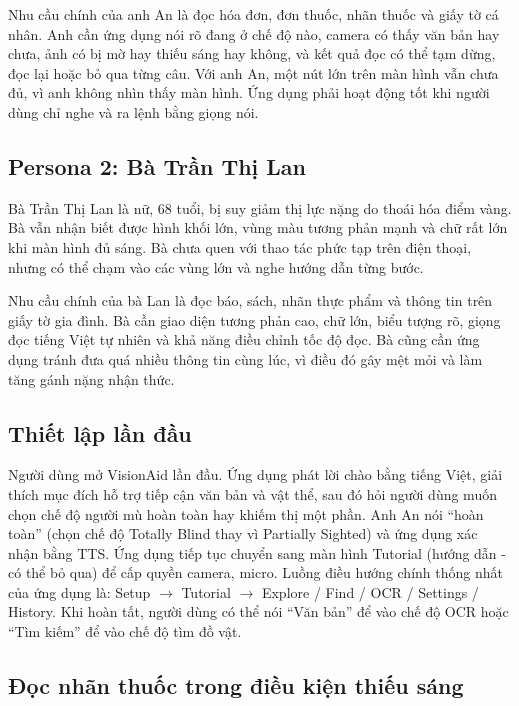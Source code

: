 \documentclass[a4paper,13pt]{report}
\begin{document}
Nhu cầu chính của anh An là đọc hóa đơn, đơn thuốc, nhãn thuốc và giấy tờ cá nhân. Anh cần ứng dụng nói rõ đang ở chế độ nào, camera có thấy văn bản hay chưa, ảnh có bị mờ hay thiếu sáng hay không, và kết quả đọc có thể tạm dừng, đọc lại hoặc bỏ qua từng câu. Với anh An, một nút lớn trên màn hình vẫn chưa đủ, vì anh không nhìn thấy màn hình. Ứng dụng phải hoạt động tốt khi người dùng chỉ nghe và ra lệnh bằng giọng nói.

\subsection{Persona 2: Bà Trần Thị Lan}

Bà Trần Thị Lan là nữ, 68 tuổi, bị suy giảm thị lực nặng do thoái hóa điểm vàng. Bà vẫn nhận biết được hình khối lớn, vùng màu tương phản mạnh và chữ rất lớn khi màn hình đủ sáng. Bà chưa quen với thao tác phức tạp trên điện thoại, nhưng có thể chạm vào các vùng lớn và nghe hướng dẫn từng bước.

Nhu cầu chính của bà Lan là đọc báo, sách, nhãn thực phẩm và thông tin trên giấy tờ gia đình. Bà cần giao diện tương phản cao, chữ lớn, biểu tượng rõ, giọng đọc tiếng Việt tự nhiên và khả năng điều chỉnh tốc độ đọc. Bà cũng cần ứng dụng tránh đưa quá nhiều thông tin cùng lúc, vì điều đó gây mệt mỏi và làm tăng gánh nặng nhận thức.


\subsection{Thiết lập lần đầu}

Người dùng mở VisionAid lần đầu. Ứng dụng phát lời chào bằng tiếng Việt, giải thích mục đích hỗ trợ tiếp cận văn bản và vật thể, sau đó hỏi người dùng muốn chọn chế độ người mù hoàn toàn hay khiếm thị một phần. Anh An nói ``hoàn toàn'' (chọn chế độ Totally Blind thay vì Partially Sighted) và ứng dụng xác nhận bằng TTS. Ứng dụng tiếp tục chuyển sang màn hình Tutorial (hướng dẫn - có thể bỏ qua) để cấp quyền camera, micro. Luồng điều hướng chính thống nhất của ứng dụng là: Setup $\rightarrow$ Tutorial $\rightarrow$ Explore / Find / OCR / Settings / History. Khi hoàn tất, người dùng có thể nói ``Văn bản'' để vào chế độ OCR hoặc ``Tìm kiếm'' để vào chế độ tìm đồ vật.

\subsection{Đọc nhãn thuốc trong điều kiện thiếu sáng}
\end{document}
